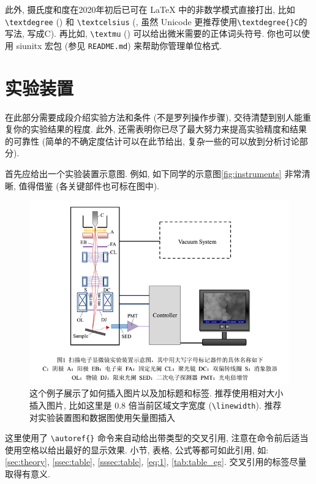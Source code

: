 \documentclass[notofandol]{mpltx}
\newcommand{\note}[1]{{\color{gray}#1}}
\begin{document}
\note{此外, 摄氏度和度在2020年初后已可在 \LaTeX{} 中的非数学模式直接打出, 比如 \texttt{\textbackslash{}textdegree} (\textdegree) 和 \texttt{\textbackslash{}textcelsius} (\textcelsius, 虽然 Unicode 更推荐使用\texttt{\textbackslash{}textdegree\{\}C}的写法, 写成\textdegree{}C).
    再比如, \texttt{\textbackslash{}textmu} (\textmu) 可以给出微米需要的正体词头符号.
    你也可以使用 \textsf{siunitx} 宏包 (参见 \texttt{README.md}) 来帮助你管理单位格式.}

\section{实验装置}
在此部分需要成段介绍实验方法和条件 (不是罗列操作步骤), 交待清楚到别人能重复你的实验结果的程度.
此外, 还需表明你已尽了最大努力来提高实验精度和结果的可靠性 (简单的不确定度估计可以在此节给出, 复杂一些的可以放到分析讨论部分).

首先应给出一个实验装置示意图.
例如, 如下同学的示意图\autoref{fig:instruments} 非常清晰, 值得借鉴 (各关键部件也可标在图中).

\begin{figure}
    \centering
    \includegraphics[width=0.85\linewidth]{fig/instruments.png}
    \caption{这个例子展示了如何插入图片以及加标题和标签.
        \note{推荐使用相对大小插入图片, 比如这里是 0.8 倍当前区域文字宽度 (\texttt{\textbackslash{}linewidth}).
            推荐对实验装置图和数据图使用矢量图插入}}
    \label{fig:instruments}
\end{figure}

\note{这里使用了 \texttt{\textbackslash{}autoref\{\}} 命令来自动给出带类型的交叉引用, 注意在命令前后适当使用空格以给出最好的显示效果.
    小节, 表格, 公式等都可如此引用, 如: \autoref{sec:theory}, \autoref{ssec:table}, \autoref{sssec:table}, \autoref{eq:1}, \autoref{tab:table_eg}.
    交叉引用的标签尽量取得有意义.}
\end{document}
